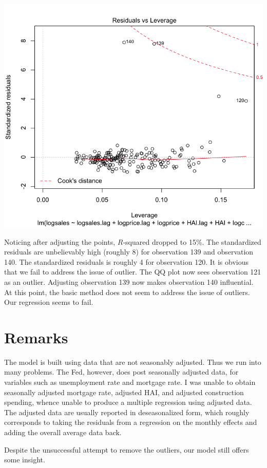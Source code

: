 \documentclass[a4 paper, 11 pt]{article}
\begin{document}
\begin{center}
\includegraphics[scale=0.4]{fsd}
\end{center}
Noticing after adjusting the points, $R$-squared dropped to 15\%. The standardized residuals are unbelievably high (roughly 8) for observation 139 and observation 140. The standardized residuals is roughly 4 for observation 120. It is obvious that we fail to address the issue of outlier. The QQ plot now sees observation 121 as an outlier. Adjusting observation 139 now makes observation 140 influential. At this point, the basic method does not seem to address the issue of outliers. Our regression seems to fail.
\section{Remarks}
The model is built using data that are not seasonably adjusted. Thus we run into many problems. The Fed, however, does post seasonally adjusted data, for variables such as unemployment rate and mortgage rate. I was unable to obtain seasonally adjusted mortgage rate, adjusted HAI, and adjusted construction spending, whence unable to produce a multiple regression using adjusted data. The adjusted data are usually reported in deseasonalized form, which roughly corresponds to taking the residuals from a regression on the monthly effects and adding the overall average data back.

Despite the unsuccessful attempt to remove the outliers, our model still offers some insight.
\end{document}
